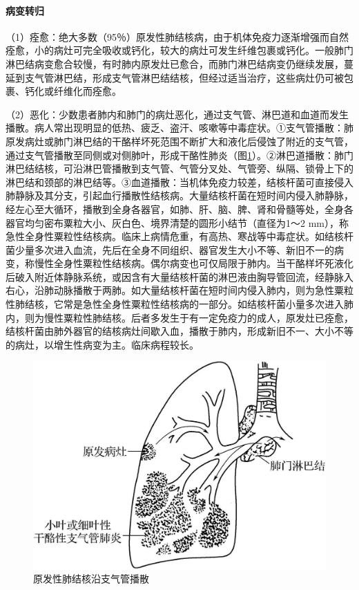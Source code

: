 \paragraph{病变转归}
（1）痊愈：绝大多数（95％）原发性肺结核病，由于机体免疫力逐渐增强而自然痊愈，小的病灶可完全吸收或钙化，较大的病灶可发生纤维包裹或钙化。一般肺门淋巴结病变愈合较慢，有时肺内原发灶已愈合，而肺门淋巴结病变仍继续发展，蔓延到支气管淋巴结，形成支气管淋巴结结核，但经过适当治疗，这些病灶仍可被包裹、钙化或纤维化而痊愈。

（2）恶化：少数患者肺内和肺门的病灶恶化，通过支气管、淋巴道和血道而发生播散。病人常出现明显的低热、疲乏、盗汗、咳嗽等中毒症状。①支气管播散：肺原发病灶或肺门淋巴结的干酪样坏死范围不断扩大和液化后侵蚀了附近的支气管，通过支气管播散至同侧或对侧肺叶，形成干酪性肺炎（图\ref{fig14-4}）。②淋巴道播散：肺门淋巴结结核，可沿淋巴管播散到支气管、气管分叉处、气管旁、纵隔、锁骨上下的淋巴结和颈部的淋巴结等。③血道播散：当机体免疫力较差，结核杆菌可直接侵入肺静脉及其分支，引起血行播散性结核病。大量结核杆菌在短时间内侵入肺静脉，经左心至大循环，播散到全身各器官，如肺、肝、脑、脾、肾和骨髓等处，全身各器官均匀密布粟粒大小、灰白色、境界清楚的圆形小结节（直径为1～2
mm），称急性全身性粟粒性结核病。临床上病情危重，有高热、寒战等中毒症状。如结核杆菌少量多次进入血流，先后在全身不同组织、器官发生大小不等、新旧不一的病变，称慢性全身性粟粒性结核病。偶尔病变也可仅局限于肺内。当干酪样坏死液化后破入附近体静脉系统，或因含有大量结核杆菌的淋巴液由胸导管回流，经静脉入右心，沿肺动脉播散于两肺。如大量结核杆菌在短时间内侵入肺内，则为急性粟粒性肺结核，它常是急性全身性粟粒性结核病的一部分。如结核杆菌小量多次进入肺内，则为慢性粟粒性肺结核。后者多发生于有一定免疫力的成人，原发灶已痊愈，结核杆菌由肺外器官的结核病灶间歇入血，播散于肺内，形成新旧不一、大小不等的病灶，以增生性病变为主。临床病程较长。

\begin{figure}[!htbp]
    \centering
    \includegraphics{./images/Image00228.jpg}
    \captionsetup{justification=centering}
    \caption{原发性肺结核沿支气管播散}
    \label{fig14-4}
\end{figure}

